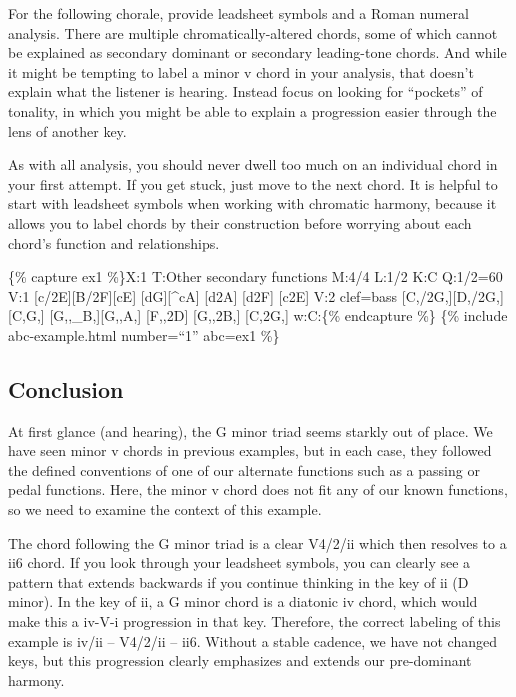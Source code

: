 \documentclass{book}
\begin{document}
For the following chorale, provide leadsheet symbols and a Roman numeral
analysis. There are multiple chromatically-altered chords, some of which
cannot be explained as secondary dominant or secondary leading-tone chords.
And while it might be tempting to label a minor v chord in your analysis, that
doesn't explain what the listener is hearing. Instead focus on looking for
``pockets'' of tonality, in which you might be able to explain a progression
easier through the lens of another key.

As with all analysis, you should never dwell too much on an individual chord
in your first attempt. If you get stuck, just move to the next chord. It is
helpful to start with leadsheet symbols when working with chromatic harmony,
because it allows you to label chords by their construction before worrying
about each chord's function and relationships.

\{\% capture ex1 \%\}X:1 T:Other secondary functions M:4/4 L:1/2 K:C Q:1/2=60
V:1 {[}c/2E{]}{[}B/2F{]}{[}cE{]}\textbar{} {[}dG{]}{[}\^{}cA{]}\textbar{}
{[}d2A{]}\textbar{} {[}d2F{]}\textbar{} {[}c2E{]}\textbar{]} V:2 clef=bass
{[}C,/2G,{]}{[}D,/2G,{]}{[}C,G,{]}\textbar{}
{[}G,,\_B,{]}{[}G,,A,{]}\textbar{} {[}F,,2D{]}\textbar{}
{[}G,,2B,{]}\textbar{} {[}C,2G,{]}\textbar{]} w:C:\{\% endcapture \%\} \{\%
include abc-example.html number=``1'' abc=ex1 \%\}

\hypertarget{conclusion-10}{%
\subsection{Conclusion}\label{conclusion-10}}

At first glance (and hearing), the G minor triad seems starkly out of place.
We have seen minor v chords in previous examples, but in each case, they
followed the defined conventions of one of our alternate functions such as a
passing or pedal functions. Here, the minor v chord does not fit any of our
known functions, so we need to examine the context of this example.

The chord following the G minor triad is a clear V4/2/ii which then resolves
to a ii6 chord. If you look through your leadsheet symbols, you can clearly
see a pattern that extends backwards if you continue thinking in the key of ii
(D minor). In the key of ii, a G minor chord is a diatonic iv chord, which
would make this a iv-V-i progression in that key. Therefore, the correct
labeling of this example is iv/ii -- V4/2/ii -- ii6. Without a stable cadence,
we have not changed keys, but this progression clearly emphasizes and extends
our pre-dominant harmony.
\end{document}
